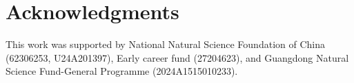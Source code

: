\documentclass{article} %
\begin{document}
\section*{Acknowledgments}

This work was supported by National Natural Science Foundation of China (62306253, U24A201397), Early career fund (27204623), and Guangdong Natural Science Fund-General Programme (2024A1515010233).





\end{document}
